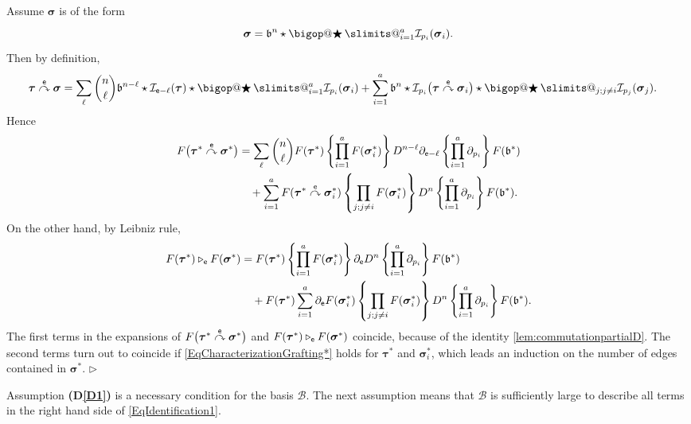 \documentclass[10pt, reqno]{amsart}
\makeatletter
\numberwithin{subsection}{section}
\numberwithin{subsubsection}{subsection}
\numberwithin{equation}{section} %
\newenvironment{Dem}[1][\unskip]{%
    \begin{list}{\hspace{1.15cm}{\sf \textbf{{\small Proof #1 --}}}}{%
        \setlength{\topsep}{0pt}%
        \setlength{\leftmargin}{0pt}%
        \setlength{\rightmargin}{0pt}%
        \setlength{\listparindent}{0pt}%
        \setlength{\itemindent}{0pt}%
        \setlength{\parsep}{0pt}%
        \addtolength{\leftmargin}{0pt}%
        \addtolength{\rightmargin}{0pt}%
    } \item }{\hfill $\rhd$\end{list}\smallskip}
\theoremstyle{mystyle}
\theoremstyle{mystyle2}
\theoremstyle{mystyle3}
\newcommand{\refD}[1]{\textbf{\textsf{(D\ref{#1})}}}
\DeclareRobustCommand\bigop[1]{%
  \mathop{\vphantom{\sum}\mathpalette\bigop@{#1}}\slimits@
}
\newcommand{\bigop@}[2]{%
  \vcenter{%
    \sbox\z@{$#1\sum$}%
    \hbox{\resizebox{\ifx#1\displaystyle.9\fi\dimexpr\ht\z@+\dp\z@}{!}{$\m@th#2$}}%
  }%
}
\newcommand{\Bigstar}{\DOTSB\bigop{\bigstar}}
\newcommand{\bstau}{\boldsymbol{\tau}}
\newcommand{\bssigma}{\boldsymbol{\sigma}}
\newcommand{\grafting}{\overset{\sf e}{\curvearrowright}}
\newcommand{\rootgrafting}{\overset{\sf e}{\curvearrowright}_1}
\newcommand{\nonrootgrafting}{\overset{\sf e}{\curvearrowright}_2}
\newcommand{\mcB}{\mathcal{B}}
\newcommand{\mcI}{\mathcal{I}}
\newcommand*{\eqdef}{=\mathrel{\rlap{%
                     \raisebox{0.3ex}{$\m@th\cdot$}}%
                     \raisebox{-0.3ex}{$\m@th\cdot$}}%
                     }
\makeatother
\begin{document}
\begin{Dem}
Assume $\bssigma$ is of the form
$$
\bssigma = \frak{b}^n\star\Bigstar_{i=1}^a \mcI_{p_i}(\bssigma_i).
$$
Then by definition,
\begin{align*}
\bstau\grafting\bssigma
&= \sum_\ell\binom{n}{\ell}
\frak{b}^{n-\ell}\star\mcI_{{\sf e}-\ell}(\bstau) \star\Bigstar_{i=1}^a 
\mcI_{p_i}(\bssigma_i)
+ \sum_{i=1}^a
\frak{b}^n\star\mcI_{p_i}\big(\bstau\grafting\bssigma_i\big)
\star\Bigstar_{j;j\neq i}\mcI_{p_j}(\bssigma_j).  
\end{align*}
Hence
\begin{align*}
F\big(\bstau^*\grafting\bssigma^*\big) 
&= \sum_\ell\binom{n}{\ell}
F(\bstau^*)\left\{\prod_{i=1}^a F(\bssigma_i^*)\right\}
D^{n-\ell}\partial_{{\sf e}-\ell}\left\{\prod_{i=1}^a \partial_{{p_i}}\right\}F(\frak{b}^*) \\
&\quad+\sum_{i=1}^a F(\bstau^*\grafting\bssigma_i^*)
\left\{\prod_{j;j\neq i}F(\bssigma_i^*)\right\}
D^n\left\{\prod_{i=1}^a \partial_{{p_i}}\right\}F(\frak{b}^*).
\end{align*}
On the other hand, by Leibniz rule,
\begin{align*}
F(\bstau^*)\triangleright_{\sf e} F(\bssigma^*)
&= F(\bstau^*)\left\{\prod_{i=1}^a F(\bssigma_i^*)\right\}
\partial_{{\sf e}}D^n\left\{\prod_{i=1}^a \partial_{{p_i}}\right\}F(\frak{b}^*)   \\
&\quad+F(\bstau^*)\sum_{i=1}^a \partial_{{\sf e}}F(\bssigma_i^*)
\left\{\prod_{j;j\neq i}F(\bssigma_i^*)\right\}
D^n\left\{\prod_{i=1}^a \partial_{{p_i}}\right\}F(\frak{b}^*).
\end{align*}
The first terms in the expansions of $F\big(\bstau^*\grafting\bssigma^*\big)$ and $F(\bstau^*)\triangleright_{\sf e} F(\bssigma^*)$ coincide, because of the identity \eqref{lem:commutationpartialD}. The second terms turn out to coincide if \eqref{EqCharacterizationGrafting*} holds for $\bstau^*$ and $\bssigma_i^*$, which leads an induction on the number of edges contained in $\bssigma^*$.
\end{Dem}

\medskip

Assumption \refD{D1} is a necessary condition for the basis $\mcB$. The next assumption means that $\mcB$ is sufficiently large to describe all terms in the right hand side of \eqref{EqIdentification1}.
\end{document}
